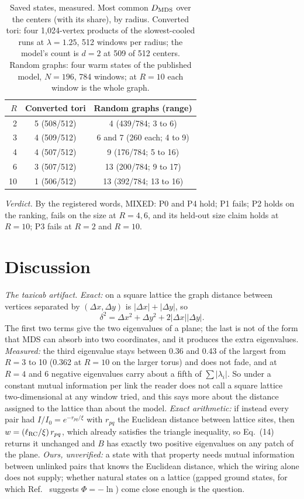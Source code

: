 \documentclass[aps,pre,10pt,twocolumn,superscriptaddress,nofootinbib]{revtex4-2}
\begin{document}
\begin{table}[t]
\caption{Saved states, measured. Most common $D_{\rm MDS}$ over the centers (with its share), by radius. Converted
tori: four 1,024-vertex products of the slowest-cooled runs at $\lambda=1.25$, 512 windows per radius; the model's
count is $d=2$ at 509 of 512 centers. Random graphs: four warm states of the published model, $N=196$, 784 windows;
at $R=10$ each window is the whole graph.}
\label{tab:saved}
\begin{ruledtabular}
\begin{tabular}{rcc}
$R$ & Converted tori & Random graphs (range)\\
\hline
2 & 5 (508/512) & 4 (439/784; 3 to 6)\\
3 & 4 (509/512) & 6 and 7 (260 each; 4 to 9)\\
4 & 4 (507/512) & 9 (176/784; 5 to 16)\\
6 & 3 (507/512) & 13 (200/784; 9 to 17)\\
10 & 1 (506/512) & 13 (392/784; 13 to 16)\\
\end{tabular}
\end{ruledtabular}
\end{table}

\emph{Verdict.} By the registered words, MIXED: P0 and P4 hold; P1 fails; P2 holds on the ranking, fails on the size
at $R=4,6$, and its held-out size claim holds at $R=10$; P3 fails at $R=2$ and $R=10$.

\section{Discussion}
\label{sec:discussion}

\emph{The taxicab artifact.} \emph{Exact:} on a square lattice the graph distance between vertices separated by
$(\Delta x,\Delta y)$ is $|\Delta x|+|\Delta y|$, so
\[
\delta^2=\Delta x^2+\Delta y^2+2|\Delta x||\Delta y| .
\]
The first two terms give the two eigenvalues of a plane; the last is not of the form that MDS can absorb into two
coordinates, and it produces the extra eigenvalues. \emph{Measured:} the third eigenvalue stays between 0.36 and 0.43 of
the largest from $R=3$ to 10 (0.362 at $R=10$ on the larger torus) and does not fade, and at $R=4$ and 6 negative
eigenvalues carry about a fifth of $\sum|\lambda_i|$. So
under a constant mutual information per link the reader does not call a square lattice two-dimensional at any
window tried, and this says more about the distance assigned to the lattice than about the model. \emph{Exact
arithmetic:} if instead every pair had $I/I_0=e^{-r_{pq}/\xi}$ with $r_{pq}$ the Euclidean distance between lattice
sites, then $w=(\ell_{\rm RC}/\xi)\,r_{pq}$, which already satisfies the triangle inequality, so Eq.~(14) returns it
unchanged and $B$ has exactly two positive eigenvalues on any patch of the plane. \emph{Ours, unverified:} a state
with that property needs mutual information between unlinked pairs that knows the Euclidean distance, which the
wiring alone does not supply; whether natural states on a lattice (gapped ground states, for which Ref.~\cite{CCM16}
suggests $\Phi=-\ln$) come close enough is the question.
\end{document}
